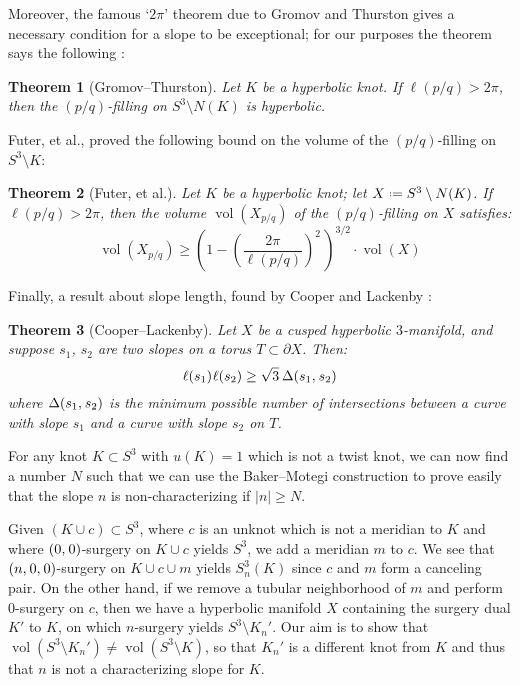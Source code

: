 \documentclass[11pt,usenames,dvipsnames,reqno]{amsart}
\newcommand{\vol}{\operatorname{vol}}
\newcommand{\defeq}{\mathrel{\vcenter{\baselineskip0.5ex\lineskiplimit0pt\hbox{\scriptsize.}\hbox{\scriptsize.}}}=}
\newcommand{\hs}{\hspace{0.05em}} %
\numberwithin{theorem}{section}
\newtheorem*{thm*}{Theorem}
\theoremstyle{ex}
\theoremstyle{rem}
\begin{document}
Moreover, the famous `$2\pi$' theorem due to Gromov and Thurston gives a necessary condition for a slope to be exceptional; for our purposes the theorem says the following \cite{cooper-lackenby}:
\begin{thm*}[Gromov--Thurston]
Let $K$ be a hyperbolic knot. If $\ell(p/q)>2\pi$, then the $(p/q)$-filling on $S^3\setminus N(K)$ is hyperbolic.
\end{thm*}
Futer, et al., \cite{futer} proved the following bound on the volume of the $(p/q)$-filling on $S^3\setminus K$:
\begin{thm*}[Futer, et al.]
Let $K$ be a hyperbolic knot; let $X\defeq S^3\setminus N(K)$. If $\ell(p/q)>2\pi$, then the volume $\vol(X_{p/q})$ of the $(p/q)$-filling on $X$ satisfies:
$$\vol(X_{p/q})\ge\left(1-\left(\frac{2\pi}{\ell(p/q)}\right)^2\,\right)^{3/2}\cdot\vol(X)$$
\end{thm*}
Finally, a result about slope length, found by Cooper and Lackenby \cite{cooper-lackenby}:
\begin{thm*}[Cooper--Lackenby]
Let $X$ be a cusped hyperbolic $3$-manifold, and suppose $s_1$, $s_2$ are two slopes on a torus $T\subset \partial X$. Then:
$$\ell(s_1)\hs\ell(s_2)\ge\sqrt{3}\hspace{0.2em}\Delta(s_1,\hs s_2)$$
where $\Delta(s_1,\hs s_2)$ is the minimum possible number of intersections between a curve with slope $s_1$ and a curve with slope $s_2$ on $T$.
\end{thm*}
For any knot $K\subset S^3$ with $u(K)=1$ which is not a twist knot, we can now find a number $N$ such that we can use the Baker--Motegi construction to prove easily that the slope $n$ is non-characterizing if $|n|\ge N$.

Given $(K\cup c)\subset S^3$, where $c$ is an unknot which is not a meridian to $K$ and where $(0,\hs0)$-surgery on $K\cup c$ yields $S^3$, we add a meridian $m$ to $c$. We see that $(n,\hs0,\hs0)$-surgery on $K\cup c\cup m$ yields $S^3_n(K)$ since $c$ and $m$ form a canceling pair. On the other hand, if we remove a tubular neighborhood of $m$ and perform $0$-surgery on $c$, then we have a hyperbolic manifold $X$ containing the surgery dual $K'$ to $K$, on which $n$-surgery yields $S^3\setminus K_n'$. Our aim is to show that $\vol(S^3\setminus K_n')\ne\vol(S^3\setminus K)$, so that $K_n'$ is a different knot from $K$ and thus that $n$ is not a characterizing slope for $K$.
\end{document}
